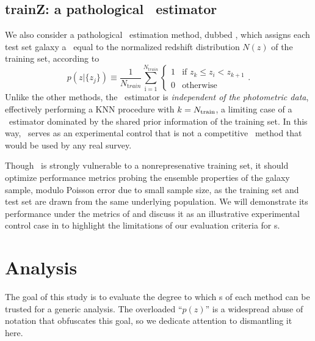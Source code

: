 \subsection{trainZ: a pathological \pz\ estimator}

We also consider a pathological \pzpdf\ estimation method, dubbed \trainz, which assigns each test set galaxy a \pzpdf\ equal to the normalized redshift distribution $N(z)$ of the training set, according to
\begin{equation}
p(z \vert \{z_{j}\}) \equiv \frac{1}{N_{ \mathrm train}}\sum_{\mathrm i=1}^{N_{\mathrm train}} \begin{cases} 1 & \text{if\ } z_{k}\leq z_{i} < z_{k+1}\\ 0 & \text{otherwise} \end{cases}.
\end{equation}
Unlike the other methods, the \trainz\ estimator is \textit{independent of the photometric data}, effectively performing a KNN procedure with $k=N_{\rm train}$, a limiting case of a \pzpdf\ estimator dominated by the shared prior information of the training set.
In this way, \trainz\ serves as an experimental control that is not a competitive \pzpdf\ method that would be used by any real survey.

Though \trainz\ is strongly vulnerable to a nonrepresenative training set, it should optimize performance metrics probing the ensemble properties of the galaxy sample, modulo Poisson error due to small sample size, as the training set and test set are drawn from the same underlying population.
We will demonstrate its performance under the metrics of  and discuss it as an illustrative experimental control case in  to highlight the limitations of our evaluation criteria for \pzpdf s.

\section{Analysis}

The goal of this study is to evaluate the degree to which \pzpdf s of each method can be trusted for a generic analysis.
The overloaded ``$p(z)$'' is a widespread abuse of notation that obfuscates this goal, so we dedicate attention to dismantling it here.

